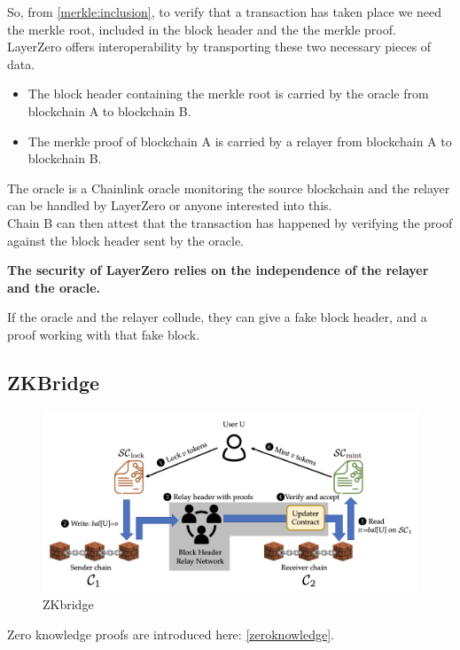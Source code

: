 So, from \ref{merkle:inclusion},  to verify that a transaction has taken place we need the merkle root, included in the block header and the the merkle proof. 
\\
LayerZero offers interoperability by transporting these two necessary pieces of data.
\begin{itemize}
    \item The block header containing the merkle root is carried by the oracle from blockchain A to blockchain B. 
    \item The merkle proof of blockchain A is carried by a relayer from blockchain A to blockchain B.
\end{itemize}

The oracle is a Chainlink oracle monitoring the source blockchain and the relayer can be handled by LayerZero or anyone interested into this. 
\\
Chain B can then attest that the transaction has happened by verifying the proof against the block header sent by the oracle.

\textbf{The security of LayerZero relies on the independence of the relayer and the oracle.}

If the oracle and the relayer collude, they can give a fake block header, and a proof working with that fake block. 


\subsection{ZKBridge \cite{xie2022zkbridge}}
\begin{figure}[H]
    \centering
\includegraphics[width=0.8\linewidth]{interoperability/zkbridge.png}
    \caption{ZKbridge}
    \label{fig:zkbridge}
\end{figure}

Zero knowledge proofs are introduced here: \ref{zeroknowledge}.

